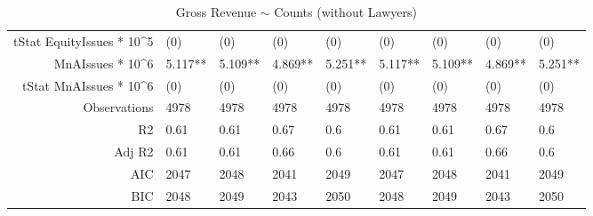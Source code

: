 \begin{table}[ht]
\begin{tabular}{rllllllll}
  tStat EquityIssues * 10^5 & (0) & (0) & (0) & (0) & (0) & (0) & (0) & (0) \\ 
  MnAIssues * 10^6 & 5.117** & 5.109** & 4.869** & 5.251** & 5.117** & 5.109** & 4.869** & 5.251** \\ 
  tStat MnAIssues * 10^6 & (0) & (0) & (0) & (0) & (0) & (0) & (0) & (0) \\ 
  Observations & 4978 & 4978 & 4978 & 4978 & 4978 & 4978 & 4978 & 4978 \\ 
  R2 & 0.61 & 0.61 & 0.67 & 0.6 & 0.61 & 0.61 & 0.67 & 0.6 \\ 
  Adj R2 & 0.61 & 0.61 & 0.66 & 0.6 & 0.61 & 0.61 & 0.66 & 0.6 \\ 
  AIC & 2047 & 2048 & 2041 & 2049 & 2047 & 2048 & 2041 & 2049 \\ 
  BIC & 2048 & 2049 & 2043 & 2050 & 2048 & 2049 & 2043 & 2050 \\ 
   \hline
\end{tabular}
\caption{Gross Revenue $\sim$ Counts (without Lawyers)} 
\end{table}
